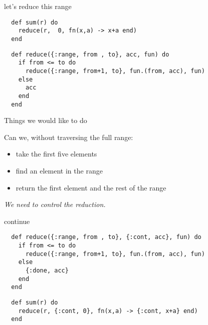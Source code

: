 \begin{frame}[fragile]{let's reduce this range}

\begin{verbatim}
  def sum(r) do
    reduce(r,  0, fn(x,a) -> x+a end)
  end
\end{verbatim}

  \vspace{10pt}

  
\begin{verbatim}
  def reduce({:range, from , to}, acc, fun) do
    if from <= to do
      reduce({:range, from+1, to}, fun.(from, acc), fun)
    else
      acc
    end
  end
\end{verbatim}

\vspace{20pt}  \pause
  
  

  
\end{frame}

\begin{frame}{Things we would like to do}

  Can we, without traversing the full range:
  \begin{itemize}
  \item take the first five elements
  \item find an element in the range
  \item return the first element and the rest of the range
  \end{itemize}

  \vspace{20pt}\pause
  {\em We need to control the reduction.}
\end{frame}



\begin{frame}[fragile]{continue}

  
\begin{verbatim}
  def reduce({:range, from , to}, {:cont, acc}, fun) do
    if from <= to do
      reduce({:range, from+1, to}, fun.(from, acc), fun)
    else
      {:done, acc}
    end
  end
\end{verbatim}

  \pause
  
\begin{verbatim}
  def sum(r) do
    reduce(r, {:cont, 0}, fn(x,a) -> {:cont, x+a} end)
  end
\end{verbatim}

  
\end{frame}

